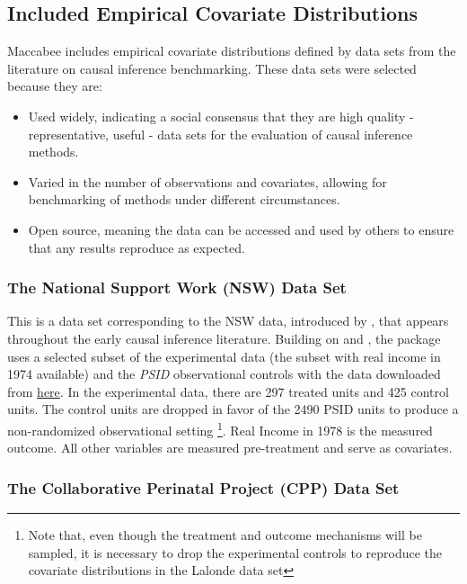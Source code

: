 \documentclass[../main.tex]{subfiles}
\begin{document}
\subsection{Included Empirical Covariate Distributions}

Maccabee includes empirical covariate distributions defined by data sets from the literature on causal inference benchmarking. These data sets were selected because they are:

\begin{itemize}
    \item Used widely, indicating a social consensus that they are high quality - representative, useful - data sets for the evaluation of causal inference methods.

    \item Varied in the number of observations and covariates, allowing for benchmarking of methods under different circumstances.

    \item Open source, meaning the data can be accessed and used by others to ensure that any results reproduce as expected.
\end{itemize}

\subsubsection{The National Support Work (NSW) Data Set}

This is a data set corresponding to the NSW data, introduced by \textcite{Lalonde1986EvaluatingData}, that appears throughout the early causal inference literature. Building on \textcite{Dehejia2005PracticalTodd} and \textcite{Smith2005DoesEstimators}, the package uses a selected subset of the \textcite{Lalonde1986EvaluatingData} experimental data (the subset with real income in 1974 available) and the \textit{PSID} observational controls with the data downloaded from \href{https://users.nber.org/~rdehejia/data/.nswdata2.html}{here}. In the experimental data, there are 297 treated units and 425 control units. The control units are dropped in favor of the 2490 PSID units to produce a non-randomized observational setting \footnote{Note that, even though the treatment and outcome mechanisms will be sampled, it is necessary to drop the experimental controls to reproduce the covariate distributions in the Lalonde data set}. Real Income in 1978 is the measured outcome. All other variables are measured pre-treatment and serve as covariates.

\subsubsection{The Collaborative Perinatal Project (CPP) Data Set}
\end{document}
